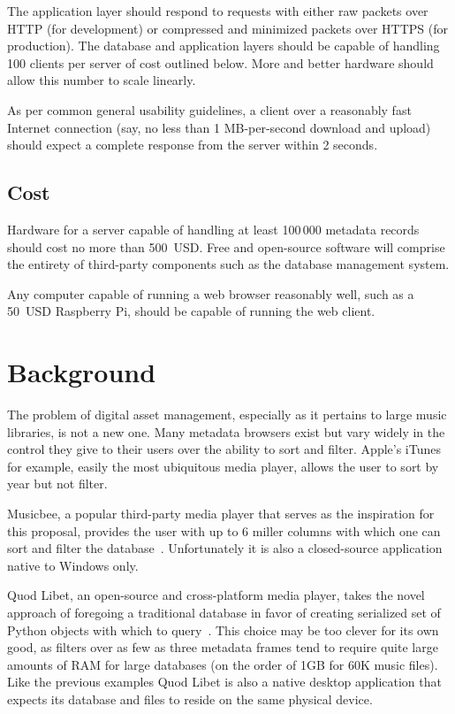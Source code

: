 \documentclass{abrice}
\begin{document}
The application layer should respond to requests with either raw packets over
HTTP (for development) or compressed and minimized packets over HTTPS (for
production). The database and application layers should be capable of handling
100 clients per server of cost outlined below. More and better hardware should
allow this number to scale linearly.

As per common general usability guidelines, a client over a reasonably fast
Internet connection (say, no less than 1 MB-per-second download and upload)
should expect a complete response from the server within 2 seconds.

\subsection{Cost}

Hardware for a server capable of handling at least 100\,000 metadata records
should cost no more than 500~USD\@. Free and open-source software will comprise
the entirety of third-party components such as the database management system.

Any computer capable of running a web browser reasonably well, such as a 50~USD
Raspberry Pi, should be capable of running the web client.

\section{Background}

The problem of digital asset management, especially as it pertains to large
music libraries, is not a new one. Many metadata browsers exist but vary widely
in the control they give to their users over the ability to sort and
filter. Apple's iTunes for example, easily the most ubiquitous media player,
allows the user to sort by year but not filter.

Musicbee, a popular third-party media player that serves as the inspiration for
this proposal, provides the user with up to 6 miller columns with which one can
sort and filter the database~\cite{musicbee}. Unfortunately it is also a
closed-source application native to Windows only.

Quod Libet, an open-source and cross-platform media player, takes the novel
approach of foregoing a traditional database in favor of creating serialized set
of Python objects with which to query~\cite{quodlibet}. This choice may be too
clever for its own good, as filters over as few as three metadata frames tend to
require quite large amounts of RAM for large databases (on the order of 1GB for
60K music files). Like the previous examples Quod Libet is also a native desktop
application that expects its database and files to reside on the same physical
device.
\end{document}

